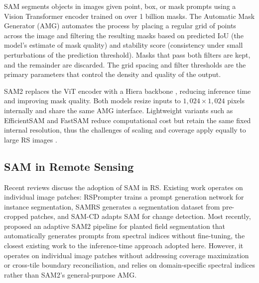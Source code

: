 \documentclass[review,11pt,authoryear]{elsarticle}
\begin{document}
SAM \citep{kirillov2023segment} segments objects in images given point, box, or mask prompts using a Vision Transformer encoder \citep{dosovitskiy2021vit} trained on over 1 billion masks. The Automatic Mask Generator (AMG) automates the process by placing a regular grid of points across the image and filtering the resulting masks based on predicted IoU (the model's estimate of mask quality) and stability score (consistency under small perturbations of the prediction threshold). Masks that pass both filters are kept, and the remainder are discarded. The grid spacing and filter thresholds are the primary parameters that control the density and quality of the output.

SAM2 \citep{ravi2024sam2} replaces the ViT encoder with a Hiera backbone \citep{ryali2023hiera}, reducing inference time and improving mask quality. Both models resize inputs to $1{,}024 \times 1{,}024$ pixels internally and share the same AMG interface. Lightweight variants such as EfficientSAM \citep{xiong2024efficientsam} and FastSAM \citep{zhao2023fastsam} reduce computational cost but retain the same fixed internal resolution, thus the challenges of scaling and coverage apply equally to large RS images \citep{zhang2025sam2survey}.

\subsection{SAM in Remote Sensing}
\label{sec:related_sam_rs}

Recent reviews \citep{osco2023sam_rs_review, wan2025samrs_survey} discuss the adoption of SAM in RS. Existing work operates on individual image patches: RSPrompter \citep{chen2024rsprompter} trains a prompt generation network for instance segmentation, SAMRS \citep{wang2024samrs} generates a segmentation dataset from pre-cropped patches, and SAM-CD \citep{ding2024samcd} adapts SAM for change detection. Most recently, \citet{liu2026asamps} proposed an adaptive SAM2 pipeline for planted field segmentation that automatically generates prompts from spectral indices without fine-tuning, the closest existing work to the inference-time approach adopted here. However, it operates on individual image patches without addressing coverage maximization or cross-tile boundary reconciliation, and relies on domain-specific spectral indices rather than SAM2's general-purpose AMG.
\end{document}
